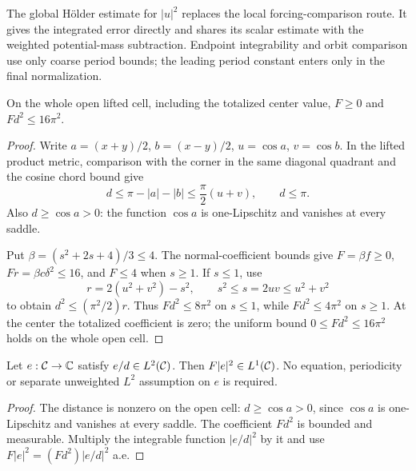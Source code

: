 \begin{remark}
The global H\"older estimate for $|u|^2$ replaces the local forcing-comparison
route. It gives the integrated error directly and shares its scalar estimate
with the weighted potential-mass subtraction. Endpoint integrability and
orbit comparison use only coarse period bounds; the leading period constant
enters only in the final normalization.
\end{remark}

\begin{lemma}
\label{lem:dd-forcing-coefficient-bound}
\leanok
On the whole open lifted cell, including the totalized center value,
$F\ge0$ and $Fd^2\le16\pi^2$.
\end{lemma}

\begin{proof}
\leanok
Write $a=(x+y)/2$, $b=(x-y)/2$, $u=\cos a$, $v=\cos b$.
In the lifted product metric, comparison with the corner in the same
diagonal quadrant and the cosine chord bound give
\[
 d\le\pi-|a|-|b|\le\frac\pi2(u+v),\qquad d\le\pi.
\]
Also $d\ge\cos a>0$: the function $\cos a$ is one-Lipschitz and vanishes
at every saddle.

Put $\beta=(s^2+2s+4)/3\le4$. The normal-coefficient bounds give
$F=\beta f\ge0$, $Fr=\beta c\delta^2\le16$, and $F\le4$ when $s\ge1$.
If $s\le1$, use
\[
 r=2(u^2+v^2)-s^2,\qquad s^2\le s=2uv\le u^2+v^2
\]
to obtain $d^2\le(\pi^2/2)r$.
Thus $Fd^2\le8\pi^2$ on $s\le1$, while $Fd^2\le4\pi^2$ on $s\ge1$.
At the center the totalized coefficient is zero; the uniform bound
$0\le Fd^2\le16\pi^2$ holds on the whole open cell.

\end{proof}

\begin{lemma}
\label{lem:dd-forcing-density-integrable}
\leanok
Let $e:\mathcal{C}\to\mathbb{C}$ satisfy $e/d\in L^2(\mathcal{C})$. Then
$F|e|^2\in L^1(\mathcal{C})$. No equation, periodicity or separate unweighted
$L^2$ assumption on $e$ is required.
\end{lemma}

\begin{proof}
\leanok
The distance is nonzero on the open cell: $d\ge\cos a>0$, since $\cos a$
is one-Lipschitz and vanishes at every saddle.
The coefficient $Fd^2$ is bounded and measurable. Multiply the integrable
function $|e/d|^2$ by it and use $F|e|^2=(Fd^2)|e/d|^2$ a.e.
\end{proof}


